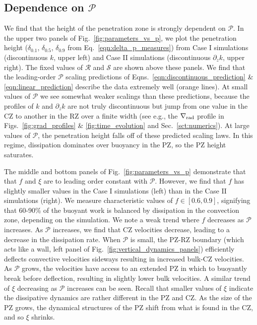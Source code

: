 \documentclass[twocolumn]{aastex631}
\newcommand{\gradrad}{\ensuremath{\nabla_{\rm{rad}}}}
\newcommand{\mP}{\ensuremath{\mathcal{P}}}
\newcommand{\mR}{\ensuremath{\mathcal{R}}}
\newcommand{\mS}{\ensuremath{\mathcal{S}}}
\begin{document}
\subsection{Dependence on $\mP$}
We find that the height of the penetration zone is strongly dependent on $\mP$.
In the upper two panels of Fig.~\ref{fig:parameters_vs_p}, we plot the penetration height ($\delta_{0.1}$, $\delta_{0.5}$, $\delta_{0.9}$ from Eq.~\ref{eqn:delta_p_measures}) from Case I simulations (discontinuous $k$, upper left) and Case II simulations (discontinuous $\partial_z k$, upper right).
The fixed values of $\mR$ and $\mS$ are shown above these panels.
We find that the leading-order $\mP$ scaling predictions of Eqns.~\ref{eqn:discontinuous_prediction} \& \ref{eqn:linear_prediction} describe the data extremely well (orange lines).
At small values of $\mP$ we see somewhat weaker scalings than these predictions, because the profiles of $k$ and $\partial_z k$ are not truly discontinuous but jump from one value in the CZ to another in the RZ over a finite width (see e.g., the $\gradrad$ profile in Figs.~\ref{fig:grad_profiles} \& \ref{fig:time_evolution} and Sec.~\ref{sct:numerics}).
At large values of $\mP$, the penetration height falls off of these predicted scaling laws.
In this regime, dissipation dominates over buoyancy in the PZ, so the PZ height saturates.

The middle and bottom panels of Fig.~\ref{fig:parameters_vs_p} demonstrate that that $f$ and $\xi$ are to leading order constant with $\mP$.
However, we find that $f$ has slightly smaller values in the Case I simulations (left) than in the Case II simulations (right).
We measure characteristic values of $f \in [0.6, 0.9]$, signifying that 60-90\% of the buoyant work is balanced by dissipation in the convection zone, depending on the simulation.
We note a weak trend where $f$ decreases as $\mP$ increases.
As $\mP$ increases, we find that CZ velocities decrease, leading to a decrease in the dissipation rate.
When $\mP$ is small, the PZ-RZ boundary (which acts like a wall, left panel of Fig.~\ref{fig:vertical_dynamics_panels}) efficiently deflects convective velocities sideways resulting in increased bulk-CZ velocities.
As $\mP$ grows, the velocities have access to an extended PZ in which to buoyantly break before deflection, resulting in slightly lower bulk velocities.
A similar trend of $\xi$ decreasing as $\mP$ increases can be seen.
Recall that smaller values of $\xi$ indicate the dissipative dynamics are rather different in the PZ and CZ.
As the size of the PZ grows, the dynamical structures of the PZ shift from what is found in the CZ, and so $\xi$ shrinks.
\end{document}
